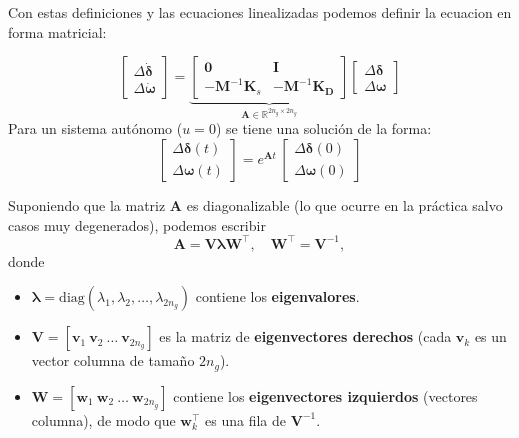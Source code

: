\documentclass{beamer}
\begin{document}
\begin{frame}
Con estas definiciones y las ecuaciones linealizadas podemos definir la ecuacion en forma matricial: 

       \begin{equation}
    \begin{bmatrix} \Delta\dot{\boldsymbol{\delta}} \\ \Delta\dot{\boldsymbol{\omega}} \end{bmatrix}
    =
    \underbrace{
    \begin{bmatrix}
        \mathbf{0}  & \mathbf{I} \\
        -\mathbf{M}^{-1}\mathbf{K}_s & -\mathbf{M}^{-1}\mathbf{K_D}
    \end{bmatrix}
    }_{\mathbf{A} \in \mathbb{R}^{2n_g \times 2n_g}}
    \begin{bmatrix} \Delta\boldsymbol{\delta} \\ \Delta\boldsymbol{\omega} \end{bmatrix}
    \label{eq:linear_sys}
\end{equation}
Para un sistema autónomo ($u=0$) se tiene una solución de la forma: 
\begin{equation}
    \begin{bmatrix} \Delta\boldsymbol{\delta}(t) \\ \Delta\boldsymbol{\omega}(t) \end{bmatrix}
    = e^{\mathbf{A}t}\,
    \begin{bmatrix} \Delta\boldsymbol{\delta}(0) \\ \Delta\boldsymbol{\omega}(0) \end{bmatrix}
    \label{eq:solution}
\end{equation}


\end{frame}
\begin{frame}

Suponiendo que la matriz $\mathbf{A}$ es diagonalizable (lo que ocurre en la práctica salvo casos muy degenerados), podemos escribir
\[
\mathbf{A} = \mathbf{V} \mathbf{\lambda} \mathbf{W}^\top, \quad \mathbf{W}^\top = \mathbf{V}^{-1},
\]
donde
\begin{itemize}
    \item $\mathbf{\lambda} = \text{diag}(\lambda_1, \lambda_2, \dots, \lambda_{2n_g})$ contiene los \textbf{eigenvalores}.
    \item $\mathbf{V} = [ \mathbf{v}_1 \ \mathbf{v}_2 \ \dots \ \mathbf{v}_{2n_g} ]$ es la matriz de \textbf{eigenvectores derechos} (cada $\mathbf{v}_k$ es un vector columna de tamaño $2n_g$).
    \item $\mathbf{W} = [ \mathbf{w}_1 \ \mathbf{w}_2 \ \dots \ \mathbf{w}_{2n_g} ]$ contiene los \textbf{eigenvectores izquierdos} (vectores columna), de modo que $\mathbf{w}_k^\top$ es una fila de $\mathbf{V}^{-1}$.
\end{itemize}

\end{frame}
\end{document}
